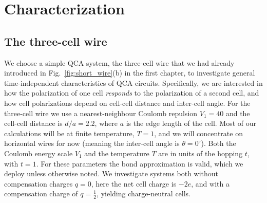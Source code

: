 \chapter{Characterization}
\graphicspath{{../gfx/chapter03/}{../plots/chapter03/}}


\section{The three-cell wire}

We choose a simple QCA system, the three-cell wire that we had already
introduced in Fig.~\ref{fig:short_wire}(b) in the first chapter, to investigate
general time-independent characteristics of QCA circuits. Specifically, we are
interested in how the polarization of one cell \emph{responds} to the
polarization of a second cell, and how cell polarizations depend on cell-cell
distance and inter-cell angle. For the three-cell wire we use a
nearest-neighbour Coulomb repulsion $V_1 = 40$ and the cell-cell distance is
$d/a = 2.2$, where $a$ is the edge length of the cell. Most of our calculations
will be at finite temperature, $T = 1$, and we will concentrate on horizontal
wires for now (meaning the inter-cell angle is $\theta = 0^{\circ}$). Both the
Coulomb energy scale $V_1$ and the temperature $T$ are in units of the hopping $t$,
with $t = 1$. For these parameters the bond approximation is valid, which we
deploy unless otherwise noted. We investigate systems both without compensation
charges $q = 0$, here the net cell charge is $-2e$, and with a compensation
charge of $q=\frac{1}{2}$, yielding charge-neutral cells.

